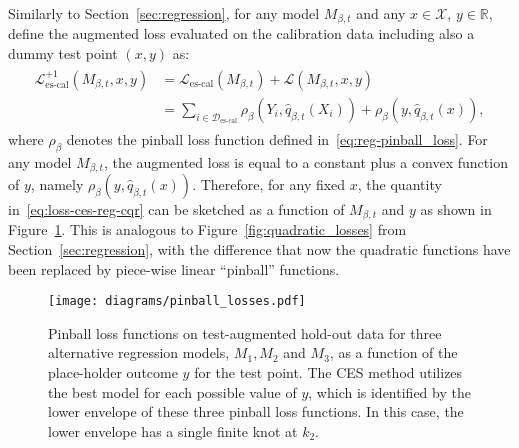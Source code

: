 Similarly to Section~\ref{sec:regression}, for any model $M_{\beta, t}$ and any $x \in \mathcal{X}$, $y \in \mathbb{R}$, define the augmented loss evaluated on the calibration data including also a dummy test point $(x,y)$ as:
\begin{align}\label{eq:loss-ces-reg-cqr}
  \begin{split}
    \mathcal{L}_{\text{es-cal}}^{+1}(M_{\beta, t},x,y)
    & = \mathcal{L}_{\text{es-cal}}(M_{\beta, t}) + \mathcal{L}(M_{\beta, t}, x, y) \\
    & = \sum_{i \in \mathcal{D}_{\text{es-cal}}} \rho_\beta(Y_i, \hat{q}_{\beta, t}(X_i)) + \rho_\beta(y, \hat{q}_{\beta, t}(x)),
  \end{split}
\end{align}
where $\rho_\beta$ denotes the pinball loss function defined in~\eqref{eq:reg-pinball_loss}.
For any model $M_{\beta, t}$, the augmented loss is equal to a constant plus a convex function of $y$, namely $\rho_\beta(y, \hat{q}_{\beta, t}(x))$.
Therefore, for any fixed $x$, the quantity in~\eqref{eq:loss-ces-reg-cqr} can be sketched as a function of $M_{\beta, t}$ and $y$ as shown in Figure~\ref{fig:pinball_losses}. This is analogous to Figure~\ref{fig:quadratic_losses} from Section~\ref{sec:regression}, with the difference that now the quadratic functions have been replaced by piece-wise linear ``pinball'' functions.


\begin{figure}[!htb]
    \centering
    \texttt{[image: diagrams/pinball\_losses.pdf]}
    \vspace{-1.5em}
    \caption{Pinball loss functions on test-augmented hold-out data for three alternative regression models, $M_1, M_2$ and $M_3$, as a function of the place-holder outcome $y$ for the test point. The CES method utilizes the best model for each possible value of $y$, which is identified by the lower envelope of these three pinball loss functions. In this case, the lower envelope has a single finite knot at $k_{2}$.}
    \label{fig:pinball_losses}%
\end{figure}


